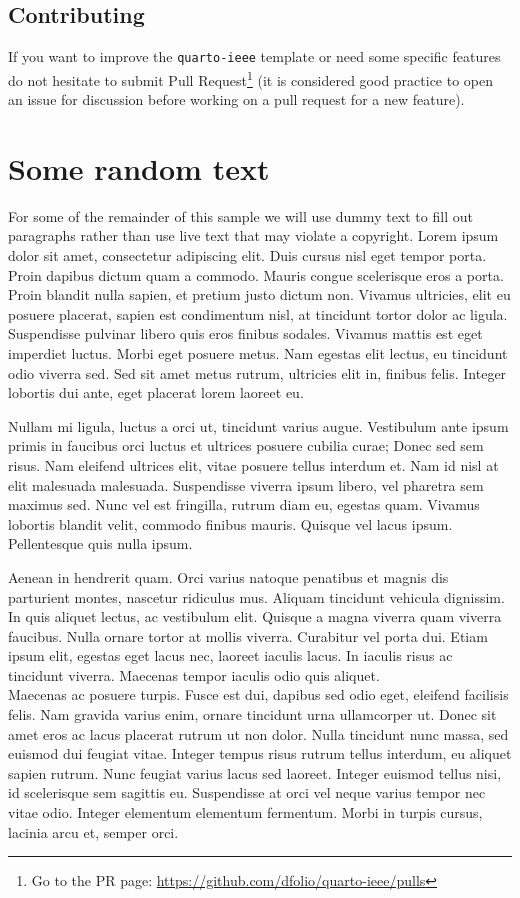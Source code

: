 \documentclass[
  twoside,
  web,
            journal,
    ]{ieeecolor}
\theoremstyle{plain}
\theoremstyle{remark}
\begin{document}
\subsection{Contributing}\label{contributing}

If you want to improve the \texttt{quarto-ieee} template or need some
specific features do not hesitate to submit Pull Request\footnote{Go to
  the PR page: \url{https://github.com/dfolio/quarto-ieee/pulls}} (it is
considered good practice to open an issue for discussion before working
on a pull request for a new feature).

\section{Some random text}\label{some-random-text}

For some of the remainder of this sample we will use dummy text to fill
out paragraphs rather than use live text that may violate a copyright.
Lorem ipsum dolor sit amet, consectetur adipiscing elit. Duis cursus
nisl eget tempor porta. Proin dapibus dictum quam a commodo. Mauris
congue scelerisque eros a porta. Proin blandit nulla sapien, et pretium
justo dictum non. Vivamus ultricies, elit eu posuere placerat, sapien
est condimentum nisl, at tincidunt tortor dolor ac ligula. Suspendisse
pulvinar libero quis eros finibus sodales. Vivamus mattis est eget
imperdiet luctus. Morbi eget posuere metus. Nam egestas elit lectus, eu
tincidunt odio viverra sed. Sed sit amet metus rutrum, ultricies elit
in, finibus felis. Integer lobortis dui ante, eget placerat lorem
laoreet eu.

Nullam mi ligula, luctus a orci ut, tincidunt varius augue. Vestibulum
ante ipsum primis in faucibus orci luctus et ultrices posuere cubilia
curae; Donec sed sem risus. Nam eleifend ultrices elit, vitae posuere
tellus interdum et. Nam id nisl at elit malesuada malesuada. Suspendisse
viverra ipsum libero, vel pharetra sem maximus sed. Nunc vel est
fringilla, rutrum diam eu, egestas quam. Vivamus lobortis blandit velit,
commodo finibus mauris. Quisque vel lacus ipsum. Pellentesque quis nulla
ipsum.

Aenean in hendrerit quam. Orci varius natoque penatibus et magnis dis
parturient montes, nascetur ridiculus mus. Aliquam tincidunt vehicula
dignissim. In quis aliquet lectus, ac vestibulum elit. Quisque a magna
viverra quam viverra faucibus. Nulla ornare tortor at mollis viverra.
Curabitur vel porta dui. Etiam ipsum elit, egestas eget lacus nec,
laoreet iaculis lacus. In iaculis risus ac tincidunt viverra. Maecenas
tempor iaculis odio quis aliquet.\\
Maecenas ac posuere turpis. Fusce est dui, dapibus sed odio eget,
eleifend facilisis felis. Nam gravida varius enim, ornare tincidunt urna
ullamcorper ut. Donec sit amet eros ac lacus placerat rutrum ut non
dolor. Nulla tincidunt nunc massa, sed euismod dui feugiat vitae.
Integer tempus risus rutrum tellus interdum, eu aliquet sapien rutrum.
Nunc feugiat varius lacus sed laoreet. Integer euismod tellus nisi, id
scelerisque sem sagittis eu. Suspendisse at orci vel neque varius tempor
nec vitae odio. Integer elementum elementum fermentum. Morbi in turpis
cursus, lacinia arcu et, semper orci.
\end{document}
